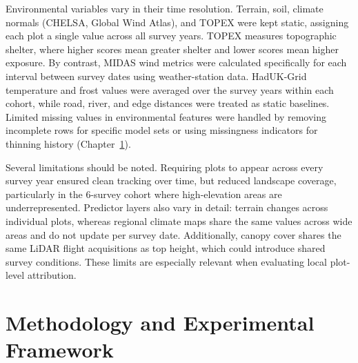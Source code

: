 \documentclass[logo,msc,ai]{infthesis}           %
\begin{document}
Environmental variables vary in their time resolution. Terrain, soil, climate normals (CHELSA, Global Wind Atlas), and TOPEX were kept static, assigning each plot a single value across all survey years. TOPEX measures topographic shelter, where higher scores mean greater shelter and lower scores mean higher exposure. By contrast, MIDAS wind metrics were calculated specifically for each interval between survey dates using weather-station data. HadUK-Grid temperature and frost values were averaged over the survey years within each cohort, while road, river, and edge distances were treated as static baselines. Limited missing values in environmental features were handled by removing incomplete rows for specific model sets or using missingness indicators for thinning history (Chapter~\ref{ch:methodology}).

Several limitations should be noted. Requiring plots to appear across every survey year ensured clean tracking over time, but reduced landscape coverage, particularly in the 6-survey cohort where high-elevation areas are underrepresented. Predictor layers also vary in detail: terrain changes across individual plots, whereas regional climate maps share the same values across wide areas and do not update per survey date. Additionally, canopy cover shares the same LiDAR flight acquisitions as top height, which could introduce shared survey conditions. These limits are especially relevant when evaluating local plot-level attribution.


\chapter{Methodology and Experimental Framework} \label{ch:methodology}
\end{document}
